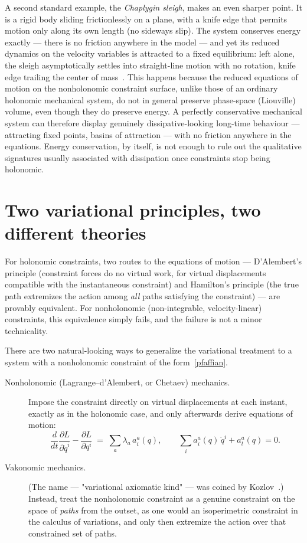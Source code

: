 A second standard example, the \emph{Chaplygin sleigh}, makes an
even sharper point. It is a rigid body sliding frictionlessly on a
plane, with a knife edge that permits motion only along its own
length (no sideways slip). The system conserves energy exactly ---
there is no friction anywhere in the model --- and yet its reduced
dynamics on the velocity variables is attracted to a fixed
equilibrium: left alone, the sleigh asymptotically settles into
straight-line motion with no rotation, knife edge trailing the
center of mass~\cite{chaplygin}. This
happens because the reduced equations of motion on the nonholonomic
constraint surface, unlike those of an ordinary holonomic mechanical
system, do not in general preserve phase-space (Liouville) volume,
even though they do preserve energy. A perfectly conservative
mechanical system can therefore display genuinely dissipative-looking
long-time behaviour --- attracting fixed points, basins of
attraction --- with no friction anywhere in the equations. Energy
conservation, by itself, is not enough to rule out the qualitative
signatures usually associated with dissipation once constraints stop
being holonomic.

\section{Two variational principles, two different theories}

For holonomic constraints, two routes to the equations of motion ---
D'Alembert's principle (constraint forces do no virtual work, for
virtual displacements compatible with the instantaneous constraint)
and Hamilton's principle (the true path extremizes the action among
\emph{all} paths satisfying the constraint) --- are provably
equivalent. For nonholonomic (non-integrable, velocity-linear)
constraints, this equivalence simply fails, and the failure is not a
minor technicality.

There are two natural-looking ways to generalize the variational
treatment to a system with a nonholonomic constraint of the
form~\eqref{pfaffian}.

\begin{description}
  \item[Nonholonomic (Lagrange--d'Alembert, or Chetaev) mechanics.]
  Impose the constraint directly on virtual displacements at each
  instant, exactly as in the holonomic case, and only afterwards
  derive equations of motion:
  \begin{equation}
    \frac{d}{dt}\frac{\partial L}{\partial \dot q^i}
    - \frac{\partial L}{\partial q^i}
    \;=\; \sum_a \lambda_a\, a_i^a(q),
    \qquad
    \sum_i a_i^a(q)\,\dot q^i + a_t^a(q) = 0 .
    \label{lagrange-dalembert}
  \end{equation}
  \item[Vakonomic mechanics.] (The name --- "variational axiomatic
  kind" --- was coined by Kozlov~\cite{kozlov}.)
  Instead, treat the nonholonomic constraint as a genuine constraint
  on the space of \emph{paths} from the outset, as one would an
  isoperimetric constraint in the calculus of variations, and only
  then extremize the action over that constrained set of paths.
\end{description}

